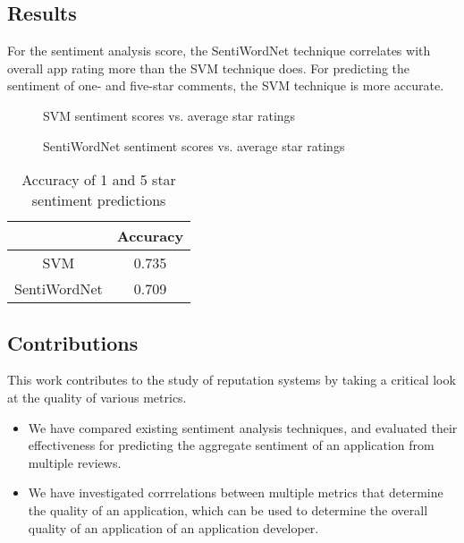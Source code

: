 \documentclass{acm_proc_article-sp}
\begin{document}
\subsection{Results}
For the sentiment analysis score, the SentiWordNet technique correlates with overall app rating more than the SVM technique does.  For predicting the sentiment of one- and five-star comments, the SVM technique is more accurate.

\begin{figure}[!h]
\centering
{}
\caption{SVM sentiment scores vs. average star ratings}
\label{fig:myfig1}
\end{figure}

\begin{figure}[!h]
\centering
{}
\caption{SentiWordNet sentiment scores vs. average star ratings}
\label{fig:myfig2}
\end{figure}

\begin{table}[!h]
\centering
\caption{Accuracy of 1 and 5 star sentiment predictions}
\begin{tabular}{|c|c|}
\hline
& \textbf{Accuracy} \\ \hline
SVM & 0.735 \\ \hline
SentiWordNet & 0.709 \\ \hline
\end{tabular}
\end{table}

\subsection{Contributions}
This work contributes to the study of reputation systems by taking a critical look at the quality of various metrics.
\begin{itemize}
\item{We have compared existing sentiment analysis techniques, and evaluated their effectiveness for predicting the aggregate sentiment of an application from multiple reviews.}
\item{We have investigated corrrelations between multiple metrics that determine the quality of an application, which can be used to determine the overall quality of an application of an application developer.}
\end{itemize}



\balancecolumns
\end{document}
